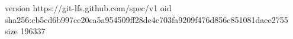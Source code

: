 version https://git-lfs.github.com/spec/v1
oid sha256:cb5cd6b997ce20ca5a954509ff28de4c703fa9209f476d856c851081daee2755
size 196337

